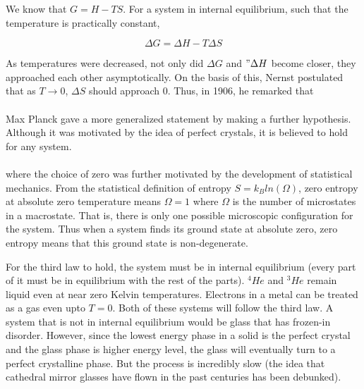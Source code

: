 \documentclass{article}
\begin{document}
	We know that $G = H - TS$.
	For a system in internal equilibrium, such that the temperature is practically constant,
	
	$$ \Delta G = \Delta H - T\Delta S $$
	
	As temperatures were decreased, not only did $\Delta G$ and $"\Delta H$ become closer, they approached each other asymptotically. On the basis of this, Nernst postulated that as $T \rightarrow 0$, $\Delta S$ should approach $0$. Thus, in 1906, he remarked that\\
	
	\noindent{}\\

	Max Planck gave a more generalized statement by making a further hypothesis. Although it was motivated by the idea of perfect crystals, it is believed to hold for any system.\\
	
	\noindent{}\\
	
	where the choice of zero was further motivated by the development of statistical mechanics. From the statistical definition of entropy $S = k_B ln(\Omega)$, zero entropy at absolute zero temperature means $\Omega = 1$ where $\Omega$ is the number of microstates in a macrostate. That is, there is only one possible microscopic configuration for the system. Thus when a system finds its ground state at absolute zero, zero entropy means that this ground state is non-degenerate.
	
	For the third law to hold, the system must be in internal equilibrium (every part of it must be in equilibrium with the rest of the parts). $^4He$ and $^3He$ remain liquid even at near zero Kelvin temperatures. Electrons in a metal can be treated as a gas even upto $T=0$. Both of these systems will follow the third law. A system that is not in internal equilibrium would be glass that has frozen-in disorder. However, since the lowest energy phase in a solid is the perfect crystal and the glass phase is higher energy level, the glass will eventually turn to a perfect crystalline phase. But the process is incredibly slow (the idea that cathedral mirror glasses have flown in the past centuries has been debunked).
	
\end{document}
